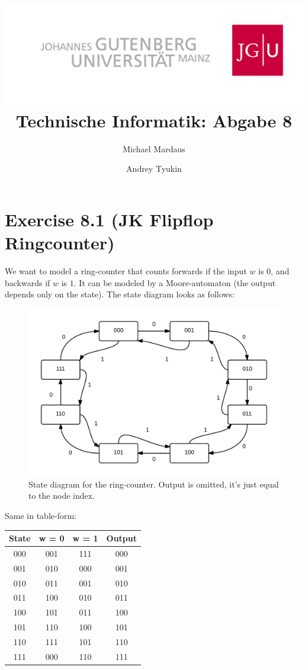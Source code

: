 \documentclass[10pt,a4paper]{scrartcl}
\author{Michael Mardaus \and Andrey Tyukin}
\title{\includegraphics[scale=0.2]{../logo_schriftzug}\\
Technische Informatik: Abgabe 8}
\newcommand{\subExercise}[1]{\vspace{0.5em} \noindent{\bf #1)}}
\begin{document}
\maketitle

\section*{Exercise 8.1 (JK Flipflop Ringcounter)}
\subExercise{a} 
  We want to model a ring-counter that counts forwards if the input $w$ is $0$, 
  and backwards if $w$ is $1$. 
  It can be modeled by a Moore-automaton (the output depends only on the state). 
  The state diagram looks as follows:
  \begin{figure}[h]
    \centering\includegraphics[width=0.8\linewidth]{images/ringCounter_diagram.png}
    \caption{State diagram for the ring-counter. Output is omitted, it's just equal to the node index.}
  \end{figure}

  Same in table-form:

  \begin{tabular}{|c|c|c|c|}
    \hline
    State & w = 0 & w = 1 & Output \\
    \hline
    000 & 001 & 111 & 000 \\
    001 & 010 & 000 & 001 \\
    010 & 011 & 001 & 010 \\
    011 & 100 & 010 & 011 \\
    100 & 101 & 011 & 100 \\
    101 & 110 & 100 & 101 \\
    110 & 111 & 101 & 110 \\
    111 & 000 & 110 & 111 \\
    \hline
  \end{tabular}
\end{document}
